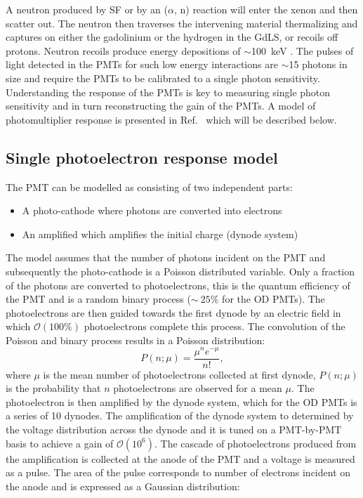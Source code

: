 A neutron produced by SF or by an ($\alpha$, n) reaction will enter the xenon and then scatter out. The neutron then traverses the intervening material thermalizing and captures on either the gadolinium or the hydrogen in the GdLS, or recoils off protons. Neutron recoils produce energy depositions of $\sim$100~keV \cite{LZNIMA}. The pulses of light detected in the PMTs for such low energy interactions are $\sim$15 photons in size and require the PMTs to be calibrated to a single photon sensitivity. Understanding the response of the PMTs is key to measuring single photon sensitivity and in turn reconstructing the gain of the PMTs. A model of photomultiplier response is presented in Ref.~\cite{BELLAMY1994468} which will be described below.
\subsection{Single photoelectron response model}\label{sec:ODComissioning/SPhEResponse}
The PMT can be modelled as consisting of two independent parts:
\begin{itemize}
    \item A photo-cathode where photons are converted into electrons
    \item An amplified which amplifies the initial charge (dynode system)
\end{itemize}
The model \cite{BELLAMY1994468} assumes that the number of photons incident on the PMT and subsequently the photo-cathode is a Poisson distributed variable. Only a fraction of the photons are converted to photoelectrons, this is the quantum efficiency of the PMT and is a random binary process ($\sim~25\%$ for the OD PMTs). The photoelectrons are then guided towards the first dynode by an electric field in which $\mathcal{O}(100\%)$ photoelectrons complete this process. The convolution of the Poisson and binary process results in a Poisson distribution:
\begin{equation}\label{eqn:SPEPoiss}
    P(n;\mu)=\frac{\mu^{n}e^{-\mu}}{n!},
\end{equation}
where $\mu$ is the mean number of photoelectrons collected at first dynode, $P(n;\mu)$ is the probability that $n$ photoelectrons are observed for a mean $\mu$.
The photoelectron is then amplified by the dynode system, which for the OD PMTs is a series of 10 dynodes. The amplification of the dynode system to determined by the voltage distribution across the dynode and it is tuned on a PMT-by-PMT basis to achieve a gain of $\mathcal{O}(10^6)$. The cascade of photoelectrons produced from the amplification is collected at the anode of the PMT and a voltage is measured as a pulse. The area of the pulse corresponds to number of electrons incident on the anode and is expressed as a Gaussian distribution:

